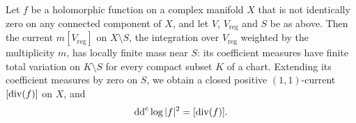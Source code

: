 
\begin{theorem}\label{thm:poincare-lelong}
Let $f$ be a holomorphic function on a complex manifold $X$ that is not identically zero on any connected component of $X$, and let $V$, $V_{\mathrm{reg}}$ and $S$ be as above. Then the current $m[V_{\mathrm{reg}}]$ on $X\setminus S$, the integration over $V_{\mathrm{reg}}$ weighted by the multiplicity $m$, has locally finite mass near $S$: its coefficient measures have finite total variation on $K\setminus S$ for every compact subset $K$ of a chart. Extending its coefficient measures by zero on $S$, we obtain a closed positive $(1,1)$-current $[\operatorname{div}(f)]$ on $X$, and
\begin{equation}\label{eq:poincare-lelong-normalized}
 \mathrm{dd}^{\mathrm{c}}\log|f|^2=[\operatorname{div}(f)].
\end{equation}
\end{theorem}
